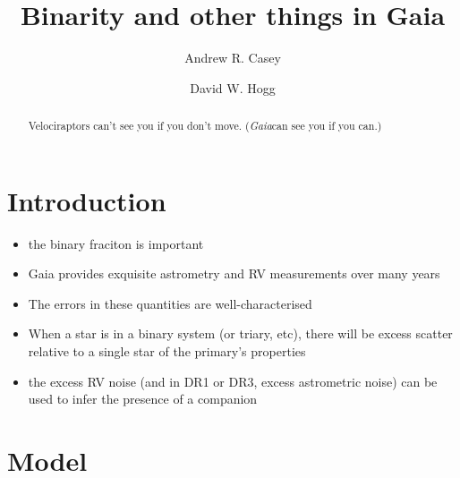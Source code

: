 \documentclass[twocolumn]{aastex61}
\newcommand{\project}[1]{\textsl{#1}}
\newcommand{\Gaia}{\project{Gaia}}
\begin{document}
\title{Binarity and other things in Gaia}


\author[0000-0003-0174-0564]{Andrew R. Casey}

\author[0000-0003-2866-9403]{David W. Hogg}

\begin{abstract}
Velociraptors can't see you if you don't move. (\Gaia can see you if you can.)
\end{abstract}



\section{Introduction} \label{sec:intro}

\begin{itemize}
\item the binary fraciton is important
\item Gaia provides exquisite astrometry and RV measurements over many years
\item The errors in these quantities are well-characterised
\item When a star is in a binary system (or triary, etc), there will be excess scatter relative to a single star of the primary's properties
\item the excess RV noise (and in DR1 or DR3, excess astrometric noise) can be used to infer the presence of a companion
\end{itemize}


\section{Model}

\end{document}

